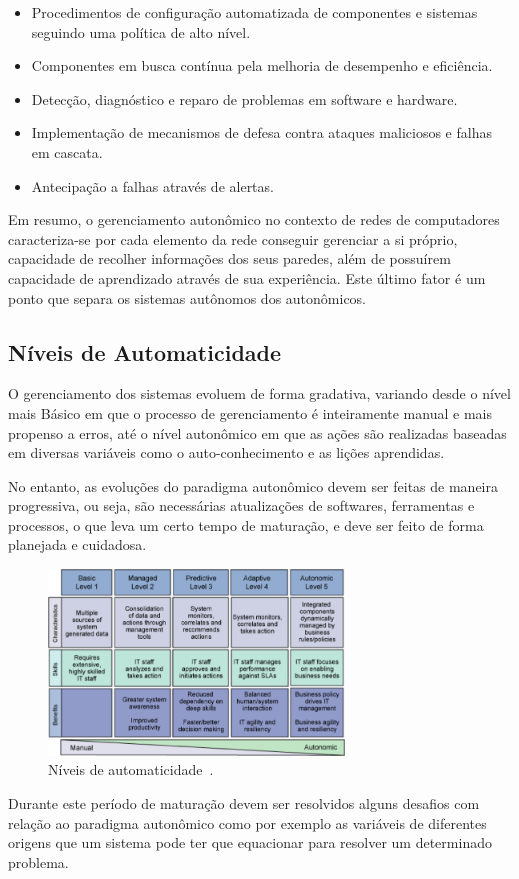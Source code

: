 \documentclass[11pt,twoside]{article}
\begin{document}
\begin{itemize}
\item Procedimentos de configuração automatizada de componentes e sistemas seguindo uma política de alto nível. 
\item Componentes em busca contínua pela melhoria de desempenho e eficiência.
\item Detecção, diagnóstico e reparo de problemas em software e hardware.
\item Implementação de mecanismos de defesa contra ataques maliciosos e falhas em cascata.
\item Antecipação a falhas através de alertas.
\end{itemize}

Em resumo, o gerenciamento autonômico no contexto de redes de computadores caracteriza-se por cada elemento da rede conseguir gerenciar a si próprio, capacidade de recolher informações dos seus paredes, além de possuírem capacidade de aprendizado através de sua experiência. Este último fator é um ponto que separa os sistemas autônomos dos autonômicos. 

\subsection{Níveis de Automaticidade}
O gerenciamento dos sistemas evoluem de forma gradativa, variando desde o nível mais Básico em que o processo de gerenciamento é inteiramente manual e mais propenso a erros, até o nível autonômico em que as ações são realizadas baseadas em diversas variáveis como o auto-conhecimento e as lições aprendidas. 

No entanto, as evoluções do paradigma autonômico devem ser feitas de maneira progressiva, ou seja, são necessárias atualizações de softwares, ferramentas e processos, o que leva um certo tempo de maturação, e deve ser feito de forma planejada e cuidadosa. 
\begin{figure}
    \centering
    \includegraphics[width=0.7\textwidth]{Picture2.png}
	\caption{Níveis de automaticidade~\cite{GANEK}.}
    \label{Sec:Intro:Fig2}
\end{figure}
Durante este período de maturação devem ser resolvidos alguns desafios com relação ao paradigma autonômico como por exemplo as variáveis de diferentes origens que um sistema pode ter que equacionar para resolver um determinado problema. 
\end{document}
